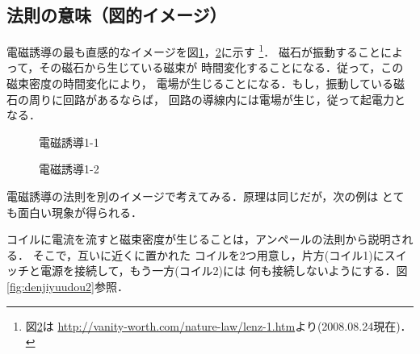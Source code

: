     \subsection{法則の意味（図的イメージ）}
                電磁誘導の最も直感的なイメージを図\ref{fig:denjiyuudou}，\ref{fig:denjiyuudou3}に示す
                    \footnote{図\ref{fig:denjiyuudou3}は
                        \url{http://vanity-worth.com/nature-law/lenz-1.htm}より(2008.08.24現在)．
                    }．
                磁石が振動することによって，その磁石から生じている磁束が
                時間変化することになる．従って，この磁束密度の時間変化により，
                電場が生じることになる．もし，振動している磁石の周りに回路があるならば，
                回路の導線内には電場が生じ，従って起電力となる．
            \begin{figure}[hbt]
                    \begin{center}
                        \caption{電磁誘導1-1}
                        \label{fig:denjiyuudou}
                    \end{center}
            \end{figure}
            \begin{figure}[hbt]
                    \begin{center}
                        \caption{電磁誘導1-2}
                        \label{fig:denjiyuudou3}
                    \end{center}
            \end{figure}

            電磁誘導の法則を別のイメージで考えてみる．原理は同じだが，次の例は
            とても面白い現象が得られる．

            コイルに電流を流すと磁束密度が生じることは，アンペールの法則から説明される．
            そこで，互いに近くに置かれた
            コイルを2つ用意し，片方(コイル1)にスイッチと電源を接続して，もう一方(コイル2)には
            何も接続しないようにする．図\ref{fig:denjiyuudou2}参照．

